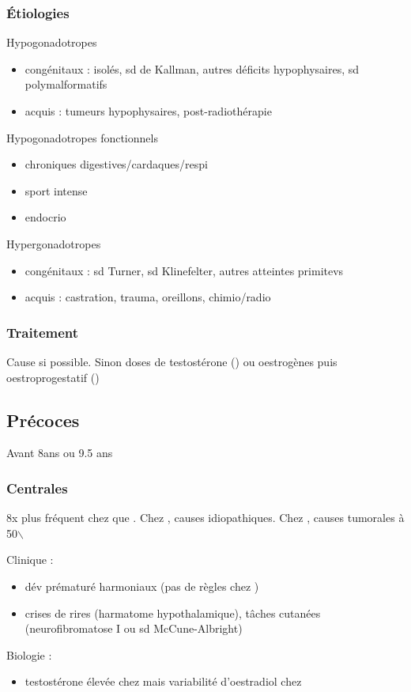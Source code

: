 \documentclass[11pt]{article}
\begin{document}
\subsubsection{Étiologies}
\label{sec:org8cbd3ed}
Hypogonadotropes
\begin{itemize}
\item congénitaux : isolés, sd de Kallman, autres déficits hypophysaires, sd
polymalformatifs
\item acquis : tumeurs hypophysaires, post-radiothérapie
\end{itemize}
Hypogonadotropes fonctionnels
\begin{itemize}
\item chroniques digestives/cardaques/respi
\item sport intense
\item endocrio
\end{itemize}
Hypergonadotropes
\begin{itemize}
\item congénitaux : sd Turner, sd Klinefelter, autres atteintes primitevs
\item acquis : castration, trauma, oreillons, chimio/radio
\end{itemize}

\subsubsection{Traitement}
\label{sec:org2c69cfd}
Cause si possible. Sinon doses \inc de testostérone (\male) ou oestrogènes puis
oestroprogestatif (\female)
\subsection{Précoces}
\label{sec:orgd0183a6}
Avant 8ans \female ou 9.5 ans \male
\subsubsection{Centrales}
\label{sec:org3f6b3bf}
8x plus fréquent chez \female que \male. Chez \female, causes
idiopathiques. Chez \male, causes tumorales à 50$\backslash$%

Clinique : 
\begin{itemize}
\item dév prématuré harmoniaux (pas de règles chez \female)
\item crises de rires (harmatome hypothalamique), tâches cutanées (neurofibromatose
I ou sd McCune-Albright)
\end{itemize}
Biologie :
\begin{itemize}
\item testostérone élevée chez \male mais variabilité d'oestradiol chez \female
\end{itemize}
\end{document}
